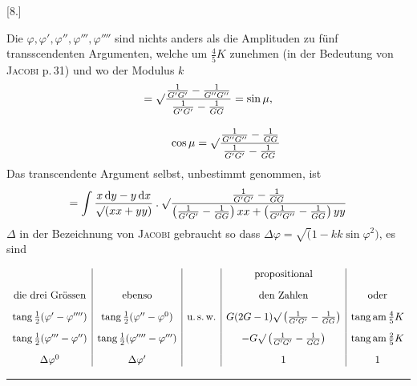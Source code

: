 \par\medskip{}\centerline{[8.]}\nobreak\smallskip
Die $\varphi,\varphi',\varphi'',\varphi''',\varphi''''$ sind nichts anders als die Amplituden zu fünf transscendenten Argumenten, welche um $\frac45K$ zunehmen (in der Bedeutung von \textsc{Jacobi}
p.\,31) und wo der Modulus $k$
\[
\begin{gathered}=\surd\frac{\frac{1}{G'G'}-\frac{1}{G''G''}}{\frac{1}{G'G'}-\frac{1}{GG}} =\sin\mu,\\[9pt]\quad{}\qquad \cos\mu=\surd\frac{\frac{1}{G''G''}-\frac{1}{GG}}{\frac{1}{G'G'}-\frac{1}{GG}}\end{gathered}
\]
Das transcendente Argument selbst, unbestimmt genommen, ist
\[
=\int\frac{x\,\mathrm{d}y-y\,\mathrm{d}x}{\surd(xx+yy)}\mathbin{.} \surd\frac{\frac{1}{G'G'}-\frac{1}{GG}} {\left(\frac{1}{G'G'}-\frac{1}{GG}\right)xx+\left(\frac{1}{G''G''}-\frac{1}{GG}\right)yy}
\]
$\Delta$ in der Bezeichnung von \textsc{Jacobi} gebraucht so dass $\Delta\varphi=\surd(1-kk\sin\varphi^2)$,
es sind
\par\nopagebreak%
\begingroup\small\setlength{\arraycolsep}{2pt}\[
\begin{array}{c|c|c|c|c} & & &\text{propositional}&\\[9pt] \text{die drei Grössen}&\text{ebenso}&&\text{den Zahlen}&\text{oder}\\[9pt] \operatorname{tang}\frac12(\varphi'-\varphi'''')& \operatorname{tang}\frac12(\varphi''-\varphi^0)&\text{u.\,s.\,w.}& G(2G-1)\surd\left(\frac{1}{G'G'}-\frac{1}{GG}\right)& \operatorname{tang}\operatorname{am}\frac45K\\[9pt] \operatorname{tang}\frac12(\varphi'''-\varphi'')& \operatorname{tang}\frac12(\varphi''''-\varphi''')&& -G\surd\left(\frac{1}{G'G'}-\frac{1}{GG}\right)& \operatorname{tang}\operatorname{am}\frac25K\\[9pt] \Delta\varphi^0&\Delta\varphi'&&1&1 \end{array}
\]\endgroup\par%

\par\nopagebreak\begin{center}\rule{.25\textwidth}{.4pt}\end{center}

